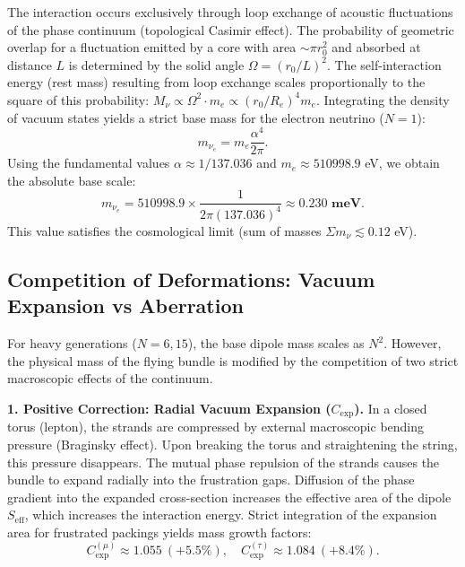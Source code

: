 \documentclass[11pt,a4paper]{article}
\begin{document}
The interaction occurs exclusively through loop exchange of acoustic fluctuations of the phase continuum (topological Casimir effect). The probability of geometric overlap for a fluctuation emitted by a core with area $\sim \pi r_0^2$ and absorbed at distance $L$ is determined by the solid angle $\Omega = (r_0/L)^2$. The self-interaction energy (rest mass) resulting from loop exchange scales proportionally to the square of this probability: $M_\nu \propto \Omega^2 \cdot m_e \propto (r_0/R_e)^4 m_e$.
Integrating the density of vacuum states yields a strict base mass for the electron neutrino ($N=1$):
\begin{equation}
	m_{\nu_e} = m_e \frac{\alpha^4}{2\pi}.
\end{equation}
Using the fundamental values $\alpha \approx 1/137.036$ and $m_e \approx 510998.9$ eV, we obtain the absolute base scale:
\begin{equation}
	m_{\nu_e} = 510998.9 \times \frac{1}{2\pi (137.036)^4} \approx \mathbf{0.230 \text{ meV}}.
\end{equation}
This value satisfies the cosmological limit (sum of masses $\Sigma m_\nu \lesssim 0.12$ eV).

\subsection{Competition of Deformations: Vacuum Expansion vs Aberration}
For heavy generations ($N=6, 15$), the base dipole mass scales as $N^2$. However, the physical mass of the flying bundle is modified by the competition of two strict macroscopic effects of the continuum.

\textbf{1. Positive Correction: Radial Vacuum Expansion ($C_{\text{exp}}$).}
In a closed torus (lepton), the strands are compressed by external macroscopic bending pressure (Braginsky effect). Upon breaking the torus and straightening the string, this pressure disappears. The mutual phase repulsion of the strands causes the bundle to expand radially into the frustration gaps. Diffusion of the phase gradient into the expanded cross-section increases the effective area of the dipole $S_{\text{eff}}$, which increases the interaction energy. Strict integration of the expansion area for frustrated packings yields mass growth factors:
\begin{equation}
	C_{\text{exp}}^{(\mu)} \approx 1.055 \ (+5.5\%), \quad C_{\text{exp}}^{(\tau)} \approx 1.084 \ (+8.4\%).
\end{equation}
\end{document}
